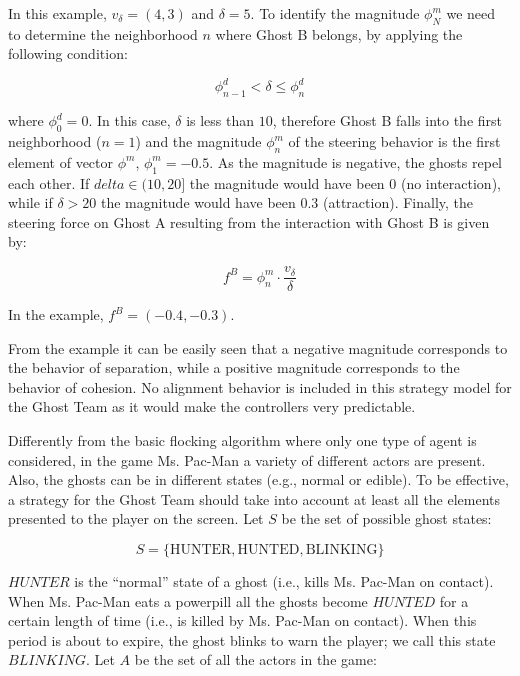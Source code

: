 \documentclass{llncs}
\begin{document}
In this example, $v_\delta=(4,3)$ and $\delta = 5$. To identify the magnitude $\phi^m_N$ we need to determine the neighborhood $n$ where Ghost B belongs, by applying the following condition:

\begin{equation}
	\label{eq:neighborhood}
	\phi^d_{n-1} < \delta \leq \phi^d_{n}
\end{equation}

where $\phi^d_0 = 0$. In this case, $\delta$ is less than $10$, therefore Ghost B falls into the first neighborhood ($n=1$) and the magnitude $\phi^m_n$ of the steering behavior is the first element of vector $\phi^m$, $\phi_1^m=-0.5$. As the magnitude is negative, the ghosts repel each other. If $delta\in (10,20]$ the magnitude would have been $0$ (no interaction), while if $\delta > 20$ the magnitude would have been $0.3$ (attraction). Finally, the steering force on Ghost A resulting from the interaction with Ghost B is given by:

\begin{equation}
	\label{eq:force}
	f^{B} = \phi^m_n \cdot \frac{v_\delta}{\delta}
\end{equation}

In the example,  $f^{B} = (-0.4, -0.3)$.

From the example it can be easily seen that a negative magnitude corresponds to the behavior of separation, while a positive magnitude corresponds to the behavior of cohesion. No alignment behavior is included in this strategy model for the Ghost Team as it would make the controllers very predictable.

Differently from the basic flocking algorithm where only one type of agent is considered, in the game Ms. Pac-Man a variety of different actors are present. Also, the ghosts can be in different states (e.g., normal or edible). To be effective, a strategy for the Ghost Team should take into account at least all the elements presented to the player on the screen. Let $S$ be the set of possible ghost states:

$$S=\{\mathrm{HUNTER}, \mathrm{HUNTED}, \mathrm{BLINKING}\}$$

$HUNTER$ is the ``normal'' state of a ghost (i.e., kills Ms. Pac-Man on contact). When Ms. Pac-Man eats a powerpill all the ghosts become $HUNTED$ for a certain length of time (i.e., is killed by Ms. Pac-Man on contact). When this period is about to expire, the ghost blinks to warn the player; we call this state $BLINKING$. Let $A$ be the set of all the actors in the game:
\end{document}
